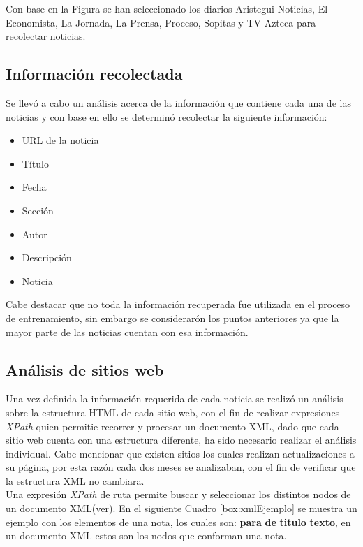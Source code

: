 Con base en la Figura  se han seleccionado los diarios Aristegui Noticias, El Economista, La Jornada, La Prensa, Proceso, Sopitas y TV Azteca para recolectar noticias.


\subsection{Información recolectada}

Se llevó a cabo un análisis acerca de la información que contiene cada una de las noticias y con base en ello se determinó recolectar la siguiente información:

\begin{itemize}
	\item URL de la noticia
	\item Título
	\item Fecha
	\item Sección
	\item Autor
	\item Descripción
	\item Noticia
\end{itemize}

Cabe destacar que no toda la información recuperada fue utilizada en el proceso de entrenamiento, sin embargo se considerarón los puntos anteriores ya que la mayor parte de las noticias cuentan con esa información.

\subsection{Análisis de sitios web}

Una vez definida la información requerida de cada noticia se realizó un análisis sobre la estructura HTML de cada sitio web, con el fin de realizar expresiones \textit{XPath} quien permitie recorrer y procesar un documento XML, dado que cada sitio web cuenta con una estructura diferente, ha sido necesario realizar el análisis individual. Cabe mencionar que existen sitios los cuales realizan actualizaciones a su página, por esta razón cada dos meses se analizaban, con el fin de verificar que la estructura XML no cambiara.
\\
Una expresión \textit{XPath} de ruta permite buscar y seleccionar los distintos nodos de un documento XML(ver). En el siguiente Cuadro \ref{box:xmlEjemplo} se muestra un ejemplo con los elementos de una nota, los cuales son: \textbf{para} \textbf{de} \textbf{titulo} \textbf{texto}, en un documento XML estos son los nodos que conforman una nota.\\

